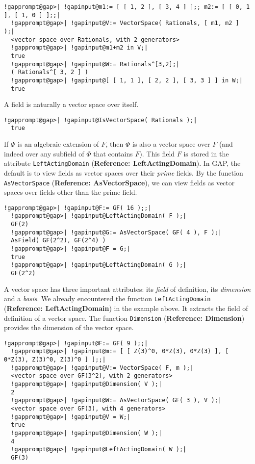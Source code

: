 \documentclass[a4paper,11pt]{report}
\begin{document}
{{ 
\begin{Verbatim}[commandchars=!@|,fontsize=\small,frame=single,label=Example]
  !gapprompt@gap>| !gapinput@m1:= [ [ 1, 2 ], [ 3, 4 ] ];; m2:= [ [ 0, 1 ], [ 1, 0 ] ];;|
  !gapprompt@gap>| !gapinput@V:= VectorSpace( Rationals, [ m1, m2 ] );|
  <vector space over Rationals, with 2 generators>
  !gapprompt@gap>| !gapinput@m1+m2 in V;|
  true
  !gapprompt@gap>| !gapinput@W:= Rationals^[3,2];|
  ( Rationals^[ 3, 2 ] )
  !gapprompt@gap>| !gapinput@[ [ 1, 1 ], [ 2, 2 ], [ 3, 3 ] ] in W;|
  true
\end{Verbatim}
 

 A field is naturally a vector space over itself. 

 
\begin{Verbatim}[commandchars=!@|,fontsize=\small,frame=single,label=Example]
  !gapprompt@gap>| !gapinput@IsVectorSpace( Rationals );|
  true
\end{Verbatim}
 

 If $\Phi$ is an algebraic extension of $F$, then $\Phi$ is also a vector space over $F$ (and indeed over any subfield of $\Phi$ that contains $F$). This field $F$ is stored in the attribute \texttt{LeftActingDomain} (\textbf{Reference: LeftActingDomain}). In \textsf{GAP}, the default is to view fields as vector spaces over their \emph{prime} fields. By the function \texttt{AsVectorSpace} (\textbf{Reference: AsVectorSpace}), we can view fields as vector spaces over fields other than the prime field. 

 
\begin{Verbatim}[commandchars=!@|,fontsize=\small,frame=single,label=Example]
  !gapprompt@gap>| !gapinput@F:= GF( 16 );;|
  !gapprompt@gap>| !gapinput@LeftActingDomain( F );|
  GF(2)
  !gapprompt@gap>| !gapinput@G:= AsVectorSpace( GF( 4 ), F );|
  AsField( GF(2^2), GF(2^4) )
  !gapprompt@gap>| !gapinput@F = G;|
  true
  !gapprompt@gap>| !gapinput@LeftActingDomain( G );|
  GF(2^2)
\end{Verbatim}
 

 A vector space has three important attributes: its \emph{field} of definition, its \emph{dimension} and a \emph{basis}. We already encountered the function \texttt{LeftActingDomain} (\textbf{Reference: LeftActingDomain}) in the example above. It extracts the field of definition of a vector space.
The function \texttt{Dimension} (\textbf{Reference: Dimension}) provides the dimension of the vector space. 

 
\begin{Verbatim}[commandchars=!@|,fontsize=\small,frame=single,label=Example]
  !gapprompt@gap>| !gapinput@F:= GF( 9 );;|
  !gapprompt@gap>| !gapinput@m:= [ [ Z(3)^0, 0*Z(3), 0*Z(3) ], [ 0*Z(3), Z(3)^0, Z(3)^0 ] ];;|
  !gapprompt@gap>| !gapinput@V:= VectorSpace( F, m );|
  <vector space over GF(3^2), with 2 generators>
  !gapprompt@gap>| !gapinput@Dimension( V );|
  2
  !gapprompt@gap>| !gapinput@W:= AsVectorSpace( GF( 3 ), V );|
  <vector space over GF(3), with 4 generators>
  !gapprompt@gap>| !gapinput@V = W;|
  true
  !gapprompt@gap>| !gapinput@Dimension( W );|
  4
  !gapprompt@gap>| !gapinput@LeftActingDomain( W );|
  GF(3)
\end{Verbatim}
 

}}
\end{document}
